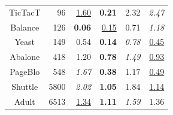 \begin{table}
\begin{center}
\begin{tabular}{crrrrr}
 TicTacT &    96 &  \underline{1.60} &     \textbf{0.21} &           2.32 &     \textit{2.47} \\
 Balance &   126 &     \textbf{0.06} &  \underline{0.15} &           0.71 &     \textit{1.18} \\
   Yeast &   149 &              0.54 &     \textbf{0.14} &  \textit{0.78} &  \underline{0.45} \\
 Abalone &   418 &              1.20 &     \textbf{0.78} &  \textit{1.49} &  \underline{0.93} \\
 PageBlo &   548 &     \textit{1.67} &     \textbf{0.38} &           1.17 &  \underline{0.49} \\
 Shuttle &  5800 &     \textit{2.02} &     \textbf{1.05} &           1.84 &  \underline{1.14} \\
   Adult &  6513 &  \underline{1.34} &     \textbf{1.11} &  \textit{1.59} &              1.36 \\
\end{tabular}
\end{center}
\end{table}
